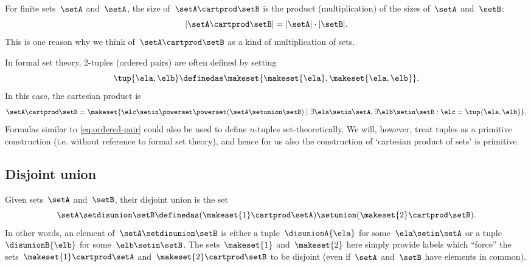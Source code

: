 \begin{remark}
    For finite sets~$\setA$ and~$\setA$, the size of~$\setA \cartprod \setB$ is the product (multiplication) of the sizes of~$\setA$ and~$\setB$:
    \begin{equation}
        \vert \setA \cartprod \setB \vert = \vert \setA \vert \cdot \vert \setB \vert.
    \end{equation}
    This is one reason why we think of~$\setA \cartprod \setB$ as a kind of multiplication of sets.
\end{remark}

\begin{remark}
    In formal set theory, 2-tuples (ordered pairs) are often defined by setting
    \begin{equation}
        \label{eq:ordered-pair}
        \tup{\ela, \elb} \definedas \makeset{ \makeset{\ela } , \makeset{ \ela, \elb } }.
    \end{equation}
    In this case, the cartesian product is
    \begin{equation}
        \setA \cartprod \setB = \makeset{ \elc \setin\powerset \powerset (\setA \setunion \setB) \mid \exists \ela \setin\setA, \exists \elb \setin\setB : \elc = \tup{\ela, \elb} }.
    \end{equation}
    Formulas similar to \cref{eq:ordered-pair} could also be used to define $n$-tuples set-theoretically.
    We will, however, treat tuples as a primitive construction (i.e. without reference to formal set theory), and hence for us also the construction of `cartesian product of sets' is primitive.
\end{remark}

\subsection{Disjoint union}
\label{sec:disjoint-union}

Given sets~$\setA$ and~$\setB$, their disjoint union is the set
\begin{equation}
    \setA \setdisunion \setB \definedas (  \makeset{ 1 } \cartprod \setA) \setunion ( \makeset{2}  \cartprod \setB).
\end{equation}
In other words, an element of~$\setA \setdisunion \setB$ is either a tuple~$\disunionA{\ela}$ for some~$\ela \setin\setA$ or a tuple $\disunionB{\elb}$ for some~$\elb \setin\setB$.
The sets~$\makeset{ 1 }$ and~$\makeset{2}$ here simply provide labels which ``force'' the sets~$\makeset{ 1 }  \cartprod \setA$ and~$ \makeset{2}  \cartprod \setB$ to be disjoint (even if~$\setA$ and~$\setB$ have elements in common).

